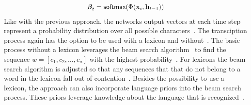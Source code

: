 \begin{equation}\label{eq:attention-gate-values}
    \boldsymbol{\beta}_{t}=\textsf{softmax}(\Phi(\textbf{x}_i,\textbf{h}_{t-1}))
\end{equation}
Like with the previous approach, the networks output vectors at each time step represent a
probability distribution over all possible characters~\citep{ghosh_visual_2017}.
The transciption process again has the option to be used with a lexicon and
without~\citep{ghosh_visual_2017}.
The basic process without a lexicon leverages the beam search algorithm~\citep{ghosh_visual_2017}
to find the sequence $w=[c_1,c_2,\ldots,c_n]$ with the highest
probability~\citep{ghosh_visual_2017}.
For lexicons the beam search algorithm is adjusted so that any sequences that that do not belong
to a word in the lexicon fall out of contention~\citep{ghosh_visual_2017}.
Besides the possibility to use a lexicon, the approach can also incorporate language priors into
the beam search process.
These priors leverage knowledge about the language that is recognized~\citep{ghosh_visual_2017}.

